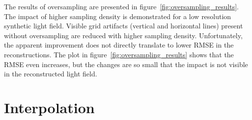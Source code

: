 The results of oversampling are presented in figure~\ref{fig:oversampling_results}.
The impact of higher sampling density is demonstrated for a low resolution synthetic light field.
Visible grid artifacts (vertical and horizontal lines) present without oversampling are reduced with higher sampling density.
Unfortunately, the apparent improvement does not directly translate to lower RMSE in the reconstructions.
\enlargethispage{\baselineskip}
The plot in figure~\ref{fig:oversampling_results} shows that the RMSE even increases, but the changes are so small that the impact is not visible in the reconstructed light field.


%
%


\section{Interpolation}
\label{sec:interpolation}

